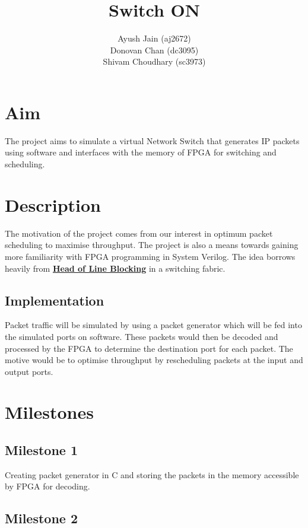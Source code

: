 \documentclass{article}
\title{\textbf{Switch ON}}
\author{Ayush Jain (aj2672)\\
        Donovan Chan (dc3095)\\
        Shivam Choudhary (sc3973) }
\begin{document}
\maketitle

\section{Aim}

The project aims to simulate a virtual Network Switch that generates IP packets using software and interfaces with the memory of FPGA for switching and scheduling.

\section{Description}

The motivation of the project comes from our interest in optimum packet scheduling to maximise throughput. The project is also a means towards gaining more familiarity with FPGA programming in System Verilog. The idea borrows heavily from \href{https://en.wikipedia.org/wiki/Head-of-line_blocking}{\textbf{Head of Line Blocking}} in a switching fabric.

\subsection{Implementation} 

Packet traffic will be simulated by using a packet generator which will be fed into the simulated ports on software. These packets would then be decoded and processed by the FPGA to determine the destination port for each packet. The motive would be to optimise throughput by rescheduling packets at the input and output ports. 

\section{Milestones}
    \subsection{Milestone 1}
    
        Creating packet generator in C and storing the packets in the memory accessible by FPGA for decoding. 
    
    \subsection{Milestone 2}
    
\end{document}
